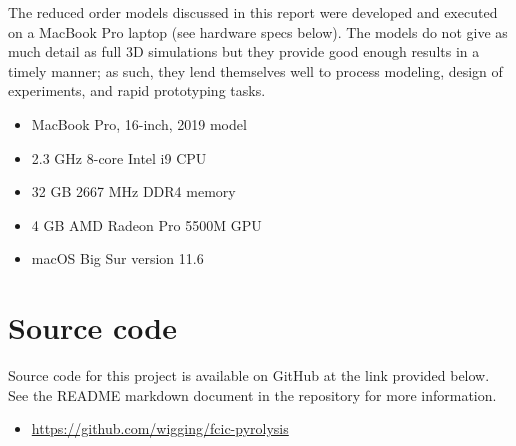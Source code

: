\documentclass[12pt,titlepage]{article}
\begin{document}
The reduced order models discussed in this report were developed and executed on a MacBook Pro laptop (see hardware specs below). The models do not give as much detail as full 3D simulations but they provide good enough results in a timely manner; as such, they lend themselves well to process modeling, design of experiments, and rapid prototyping tasks.

\begin{itemize}
    \item MacBook Pro, 16-inch, 2019 model
    \item 2.3 GHz 8-core Intel i9 CPU
    \item 32 GB 2667 MHz DDR4 memory
    \item 4 GB AMD Radeon Pro 5500M GPU
    \item macOS Big Sur version 11.6
\end{itemize}

\section{Source code}

Source code for this project is available on GitHub at the link provided below. See the README markdown document in the repository for more information.

\begin{itemize}
    \item \url{https://github.com/wigging/fcic-pyrolysis}
\end{itemize}


\printbibliography
\end{document}
